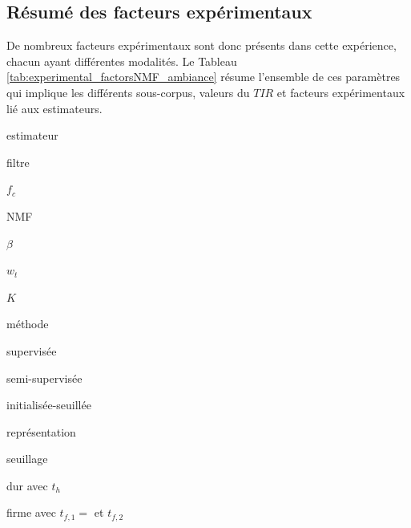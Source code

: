 \subsection{Résumé des facteurs expérimentaux}

De nombreux facteurs expérimentaux sont donc présents dans cette expérience, chacun ayant différentes modalités. Le Tableau \ref{tab:experimental_factorsNMF_ambiance} résume l'ensemble de ces paramètres qui implique les différents sous-corpus, valeurs du $TIR$ et facteurs expérimentaux lié aux estimateurs.


\begin{longenum}
	\item estimateur
	\begin{longenum}
		\item filtre
		\begin{longenum}
			\item $f_c$
		\end{longenum}
		\item NMF
		\begin{longenum}
			\item $\beta$
			\item $w_t$
			\item $K$
			\item méthode
			\begin{longenum}
				\item supervisée
				\item semi-supervisée
				\item initialisée-seuillée
				\begin{longenum}
					\item représentation
					\item seuillage
					\begin{longenum}
						\item dur avec $t_h$
						\item firme avec $t_{f,1} = $ et $t_{f,2}$
					\end{longenum}
				\end{longenum}
			\end{longenum}
		\end{longenum}
	\end{longenum}
\end{longenum}


